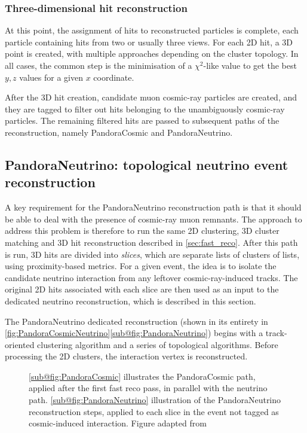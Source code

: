 \subsubsection{Three-dimensional hit reconstruction}

At this point, the assignment of hits to reconstructed particles is complete, each particle containing hits from two or usually three views. For each 2D hit, a 3D point is created, with multiple approaches depending on the cluster topology. In all cases, the common step is the minimisation of a $\chi^2$-like value to get the best $y,z$ values for a given $x$ coordinate. 

After the 3D hit creation, candidate muon cosmic-ray particles are created, and they are tagged to filter out hits belonging to the unambiguously cosmic-ray particles. The remaining filtered hits are passed to subsequent paths of the reconstruction, namely PandoraCosmic and PandoraNeutrino. 

\subsection{PandoraNeutrino: topological neutrino event reconstruction} \label{sec:PandoraNeutrino}

A key requirement for the PandoraNeutrino reconstruction path is that it should be able to deal with the presence of cosmic-ray muon remnants. The approach to address this problem is therefore to run the same 2D clustering, 3D cluster matching and 3D hit reconstruction described in \autoref{sec:fast_reco}. After this path is run, 3D hits are divided into \emph{slices}, which are separate lists of clusters of lists, using proximity-based metrics. For a given event, the idea is to isolate the candidate neutrino interaction from any leftover cosmic-ray-induced tracks. The original 2D hits associated with each slice are then used as an input to the dedicated neutrino reconstruction, which is described in this section. 

The PandoraNeutrino dedicated reconstruction (shown in its entirety in \autoref{fig:PandoraCosmicNeutrino}\ref{sub@fig:PandoraNeutrino}) begins with a track-oriented clustering algorithm and a series of topological algorithms. Before processing the 2D clusters, the interaction vertex is reconstructed. 

\begin{figure}
    \centering
    \caption[PandoraCosmic and PandoraNeutrino paths illustration]{\ref{sub@fig:PandoraCosmic} illustrates the PandoraCosmic path, applied after the first fast reco pass, in parallel with the neutrino path. \ref{sub@fig:PandoraNeutrino} illustration of the PandoraNeutrino reconstruction steps, applied to each slice in the event not tagged as cosmic-induced interaction. Figure adapted from \cite{MicroBooNE:2017xvs}}
    \label{fig:PandoraCosmicNeutrino}
\end{figure}

